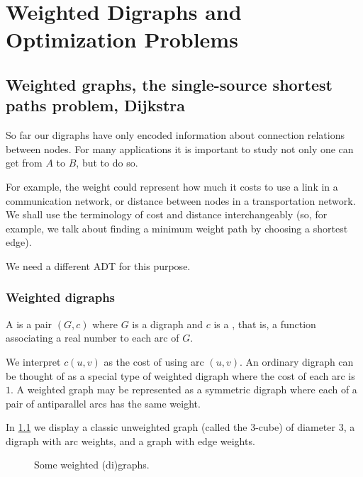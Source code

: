 \part{Weighted Digraphs and Optimization Problems}
\label{ch:weighted}


\chapter{Weighted graphs, the single-source shortest paths problem, Dijkstra}



So far our digraphs have only encoded information about connection
relations between nodes. For many applications it is important to study
not only  one can get from $A$ to $B$, but
 to do so.

For example, the weight could represent how much it costs to use a link
in a communication network, or distance between nodes in a
transportation network. We shall use the terminology of cost and distance
interchangeably (so, for example, we talk about finding a minimum weight
path by choosing a shortest edge).

We need a different ADT for this purpose. 

\section{Weighted digraphs}
\label{sec:weighted}

\begin{Definition}
A  is a pair $(G, c)$ where $G$ is a digraph
and $c$ is a , that is, a function associating a
real number to each arc of $G$.
\end{Definition}

We interpret $c(u, v)$ as the cost of using arc $(u, v)$. An ordinary digraph 
can be thought of as a special type of weighted digraph where the cost of each 
arc is $1$. A weighted graph may be represented as a symmetric digraph where 
each of a pair of antiparallel arcs has the same weight.

In \cref{fig:graphExample5} we display a classic unweighted graph
(called the $3$-cube) of diameter $3$, a digraph with arc weights, and a
graph with edge weights.

\begin{figure}

\caption{Some weighted (di)graphs.}
\label{fig:graphExample5}
\end{figure}

